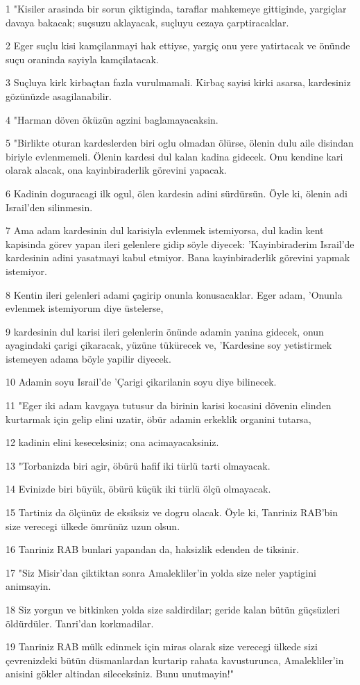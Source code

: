 \par 1 "Kisiler arasinda bir sorun çiktiginda, taraflar mahkemeye gittiginde, yargiçlar davaya bakacak; suçsuzu aklayacak, suçluyu cezaya çarptiracaklar.
\par 2 Eger suçlu kisi kamçilanmayi hak ettiyse, yargiç onu yere yatirtacak ve önünde suçu oraninda sayiyla kamçilatacak.
\par 3 Suçluya kirk kirbaçtan fazla vurulmamali. Kirbaç sayisi kirki asarsa, kardesiniz gözünüzde asagilanabilir.
\par 4 "Harman döven öküzün agzini baglamayacaksin.
\par 5 "Birlikte oturan kardeslerden biri oglu olmadan ölürse, ölenin dulu aile disindan biriyle evlenmemeli. Ölenin kardesi dul kalan kadina gidecek. Onu kendine kari olarak alacak, ona kayinbiraderlik görevini yapacak.
\par 6 Kadinin doguracagi ilk ogul, ölen kardesin adini sürdürsün. Öyle ki, ölenin adi Israil'den silinmesin.
\par 7 Ama adam kardesinin dul karisiyla evlenmek istemiyorsa, dul kadin kent kapisinda görev yapan ileri gelenlere gidip söyle diyecek: 'Kayinbiraderim Israil'de kardesinin adini yasatmayi kabul etmiyor. Bana kayinbiraderlik görevini yapmak istemiyor.
\par 8 Kentin ileri gelenleri adami çagirip onunla konusacaklar. Eger adam, 'Onunla evlenmek istemiyorum diye üstelerse,
\par 9 kardesinin dul karisi ileri gelenlerin önünde adamin yanina gidecek, onun ayagindaki çarigi çikaracak, yüzüne tükürecek ve, 'Kardesine soy yetistirmek istemeyen adama böyle yapilir diyecek.
\par 10 Adamin soyu Israil'de 'Çarigi çikarilanin soyu diye bilinecek.
\par 11 "Eger iki adam kavgaya tutusur da birinin karisi kocasini dövenin elinden kurtarmak için gelip elini uzatir, öbür adamin erkeklik organini tutarsa,
\par 12 kadinin elini keseceksiniz; ona acimayacaksiniz.
\par 13 "Torbanizda biri agir, öbürü hafif iki türlü tarti olmayacak.
\par 14 Evinizde biri büyük, öbürü küçük iki türlü ölçü olmayacak.
\par 15 Tartiniz da ölçünüz de eksiksiz ve dogru olacak. Öyle ki, Tanriniz RAB'bin size verecegi ülkede ömrünüz uzun olsun.
\par 16 Tanriniz RAB bunlari yapandan da, haksizlik edenden de tiksinir.
\par 17 "Siz Misir'dan çiktiktan sonra Amalekliler'in yolda size neler yaptigini animsayin.
\par 18 Siz yorgun ve bitkinken yolda size saldirdilar; geride kalan bütün güçsüzleri öldürdüler. Tanri'dan korkmadilar.
\par 19 Tanriniz RAB mülk edinmek için miras olarak size verecegi ülkede sizi çevrenizdeki bütün düsmanlardan kurtarip rahata kavusturunca, Amalekliler'in anisini gökler altindan sileceksiniz. Bunu unutmayin!"

